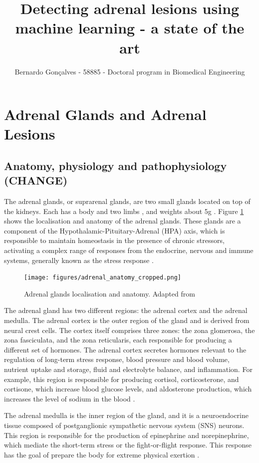 \documentclass{article}
\title{Detecting adrenal lesions using machine learning - a state of the art}
\author{Bernardo Gonçalves - 58885 - Doctoral program in Biomedical Engineering}
\begin{document}
\maketitle

\section{Adrenal Glands and Adrenal Lesions}

\subsection{Anatomy, physiology and pathophysiology (CHANGE)}

The adrenal glands, or suprarenal glands, are two small glands located on top of
the kidneys.  Each has a body and two limbs \cite{Baba2012}, and weights about
5g \cite{brit}. Figure \ref{fig:adrenal_ana} shows the localisation and anatomy
of the adrenal glands. These glands are a component of the
Hypothalamic-Pituitary-Adrenal (HPA) axis, which is responsible to maintain
homeostasis in the presence of chronic stressors, activating a complex range of
responses from the endocrine, nervous and immune systems, generally known as the
stress response \cite{open}.

\begin{figure}
    \centering
    \texttt{[image: figures/adrenal\_anatomy\_cropped.png]}
    \caption{Adrenal glands localisation and anatomy.  Adapted from \cite{Grossman2022}}
    \label{fig:adrenal_ana}
\end{figure}

The adrenal gland has two different regions: the adrenal cortex and the adrenal
medulla. The adrenal cortex is the outer region of the gland and is derived from
neural crest cells. The cortex itself comprises three zones: the zona glomerosa,
the zona fasciculata, and the zona reticularis, each responsible for producing a
different set of hormones. The adrenal cortex secretes hormones relevant to the
regulation of long-term stress response, blood pressure and blood volume,
nutrient uptake and storage, fluid and electrolyte balance, and inflammation.
For example, this region is responsible for producing cortisol, corticosterone,
and cortisone, which increase blood glucose levels, and aldosterone production,
which increases the level of sodium in the blood \cite{open}.

The adrenal medulla is the inner region of the gland, and it is a neuroendocrine
tissue composed of postganglionic sympathetic nervous system (SNS) neurons. This
region is responsible for the production of epinephrine and norepinephrine,
which mediate the short-term stress or the fight-or-flight response. This
response has the goal of prepare the body for extreme physical exertion \cite{open}.
\end{document}
